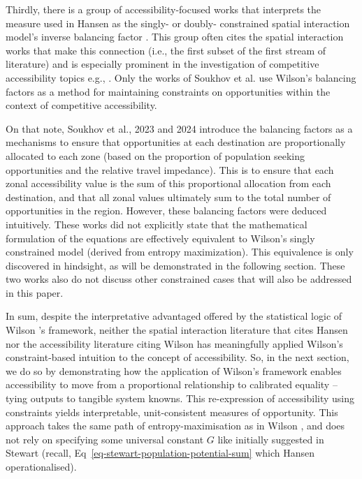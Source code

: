 \documentclass[
  10pt,
  letterpaper,
]{article}
\begin{document}
Thirdly, there is a group of accessibility-focused works that interprets
the measure used in Hansen \citep{hansen1959} as the singly- or doubly-
constrained spatial interaction model's inverse balancing factor
\citep[e.g.,][]{vickermanAccessibilityAttractionPotential1974}. This
group often cites the spatial interaction works that make this
connection (i.e., the first subset of the first stream of literature)
and is especially prominent in the investigation of competitive
accessibility topics e.g.,
\citep{karstEvaluationAccessibilityImpacts2003, geurs2006accessibility, willigers2007accessibility, el2011place, curtis2010planning, manaugh2012makes, chen2013regional, alonso2014labour, albacete2017measuring, sahebgharani2019computing, mayaud2019future, allenMeasureCompetitiveAccess2020, levinsonGeneralTheoryAccess2020, marwal2022literature, su2023untangling}.
Only the works of Soukhov et al.
\citep{soukhovIntroducingSpatialAvailability2023, soukhovMultimodalSpatialAvailability2024}
use Wilson's \citep{wilson1971} balancing factors as a method for
maintaining constraints on opportunities within the context of
competitive accessibility.

On that note, Soukhov et al., 2023 and 2024
\citep{soukhovIntroducingSpatialAvailability2023, soukhovMultimodalSpatialAvailability2024}
introduce the balancing factors as a mechanisms to ensure that
opportunities at each destination are proportionally allocated to each
zone (based on the proportion of population seeking opportunities and
the relative travel impedance). This is to ensure that each zonal
accessibility value is the sum of this proportional allocation from each
destination, and that all zonal values ultimately sum to the total
number of opportunities in the region. However, these balancing factors
were deduced intuitively. These works did not explicitly state that the
mathematical formulation of the equations are effectively equivalent to
Wilson's singly constrained model (derived from entropy maximization).
This equivalence is only discovered in hindsight, as will be
demonstrated in the following section. These two works also do not
discuss other constrained cases that will also be addressed in this
paper.

In sum, despite the interpretative advantaged offered by the statistical
logic of Wilson \citep{wilson1971}'s framework, neither the spatial
interaction literature that cites Hansen \citep{hansen1959} nor the
accessibility literature citing Wilson \citep{wilson1971} has
meaningfully applied Wilson's constraint-based intuition to the concept
of accessibility. So, in the next section, we do so by demonstrating how
the application of Wilson's framework enables accessibility to move from
a proportional relationship to calibrated equality -- tying outputs to
tangible system knowns. This re-expression of accessibility using
constraints yields interpretable, unit-consistent measures of
opportunity. This approach takes the same path of entropy-maximisation
as in Wilson \citep{wilson1971}, and does not rely on specifying some
universal constant \(G\) like initially suggested in Stewart
\citep{stewartDemographicGravitationEvidence1948} (recall,
Eq~\ref{eq-stewart-population-potential-sum} which Hansen
\citep{hansen1959} operationalised).
\end{document}
